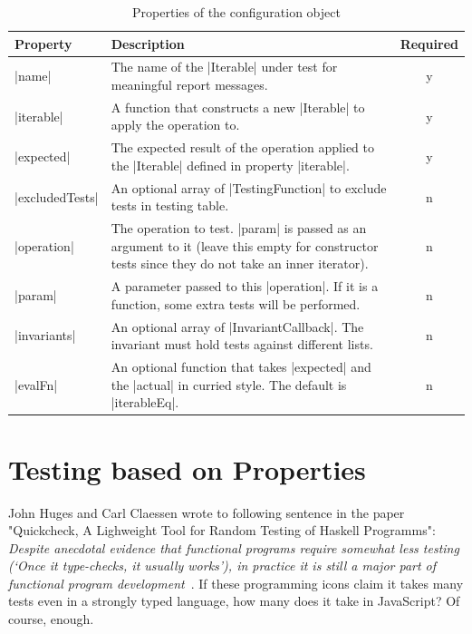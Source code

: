 \begin{table}[H]
  \center
  \begin{tabular}{ l m{10cm} c}
    \textbf{Property} & \textbf{Description} & \textbf{Required}\\
    \hline
    |name|            & The name of the |Iterable| under test for meaningful 
                      report messages. 
                    & y 
                    \\ 
    |iterable|        & A function that constructs a new |Iterable| to apply the 
                      operation to. 
                    & y 
                    \\  
    |expected|        & The expected result of the operation applied to the |Iterable|
                      defined in property |iterable|.
                    & 
                    y  \\ 
    |excludedTests|   & An optional array of |TestingFunction| to exclude tests
                      in testing table. 
                    & n 
                    \\
    |operation|       & The operation to test. |param| is passed as an argument
                      to it
                     (leave this empty for constructor 
                      tests since they do not take an inner iterator). 
                    & n 
                    \\
    |param|           & A parameter passed to this |operation|. If it is a
                      function, some extra tests will be performed. 
                    & n
                    \\ 
    |invariants|      & An optional array of |InvariantCallback|. The invariant 
                      must hold tests against different lists. 
                    & n
                    \\
    |evalFn|          & An optional function that takes |expected| and the |actual| 
                      in curried style. The default is |iterableEq|.
                    & n 
                    \\
  \end{tabular}
  \caption{Properties of the configuration object}
\label{tab:testing_table}
\end{table}


\section{Testing based on Properties}
\label{sec:Testing based on Properties}
John Huges and Carl Claessen wrote to following sentence in the paper
"Quickcheck, A Lighweight Tool for Random Testing of Haskell Programms":
\textit{
Despite anecdotal evidence that functional programs require somewhat less
testing (`Once it type-checks, it usually works'), in practice it is still a 
major part of functional program development}~\cite{quickcheck_hughes}.
If these programming icons claim it takes many tests even in a strongly typed 
language, how many does it take in JavaScript? Of course, enough.


